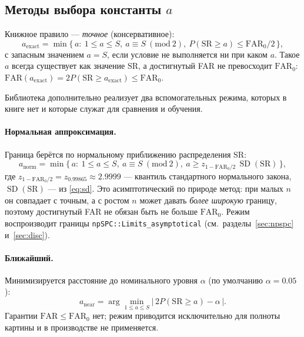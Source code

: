 \documentclass[11pt,a4paper]{article}
\newcommand{\SR}{\mathrm{SR}}
\newcommand{\FAR}{\mathrm{FAR}}
\newcommand{\FARz}{\mathrm{FAR}_0}
\newcommand{\SD}{\operatorname{SD}}
\begin{document}
\subsection{Методы выбора константы $a$}
\label{sec:methods}

Книжное правило \cite[с.~198, Note~4.2]{Chakraborti2019} ---
\emph{точное} (консервативное):
\begin{equation}
a_{\mathrm{exact}}=\min\bigl\{\,a:\ 1\le a\le S,\ a\equiv S\ (\mathrm{mod}\ 2),\
P(\SR\ge a)\le \FARz/2 \,\bigr\},
\label{eq:cons}
\end{equation}
с запасным значением $a=S$, если условие не выполняется ни при каком $a$.
Такое $a$ всегда существует как значение $\SR$, а достигнутый FAR не
превосходит $\FARz$: $\FAR(a_{\mathrm{exact}})=2P(\SR\ge a_{\mathrm{exact}})
\le \FARz$.

Библиотека дополнительно реализует два вспомогательных режима, которых в
книге нет и которые служат для сравнения и обучения.

\paragraph{Нормальная аппроксимация.} Граница берётся по
нормальному приближению распределения $\SR$:
\begin{equation}
a_{\mathrm{norm}}=\min\bigl\{\,a:\ 1\le a\le S,\ a\equiv S\ (\mathrm{mod}\ 2),\
a\ge z_{1-\FARz/2}\,\SD(\SR)\,\bigr\},
\label{eq:sym}
\end{equation}
где $z_{1-\FARz/2}=z_{0.99865}\approx2.9999$ --- квантиль стандартного
нормального закона, $\SD(\SR)$ --- из \eqref{eq:sd}. Это асимптотический по
природе метод: при малых $n$ он совпадает с точным, а с ростом $n$
может давать \emph{более широкую} границу, поэтому достигнутый FAR не
обязан быть не больше $\FARz$. Режим воспроизводит границы
\texttt{npSPC::Limits\_asymptotical} (см.~разделы~\ref{sec:npspc}
и~\ref{sec:disc}).

\paragraph{Ближайший.} Минимизируется расстояние до номинального уровня
$\alpha$ (по умолчанию $\alpha=0.05$):
\begin{equation}
a_{\mathrm{near}}=\arg\min_{1\le a\le S}\bigl|\,2P(\SR\ge a)-\alpha\,\bigr|.
\label{eq:near}
\end{equation}
Гарантии $\FAR\le\FARz$ нет; режим приводится исключительно для полноты
картины и в производстве не применяется.
\end{document}
